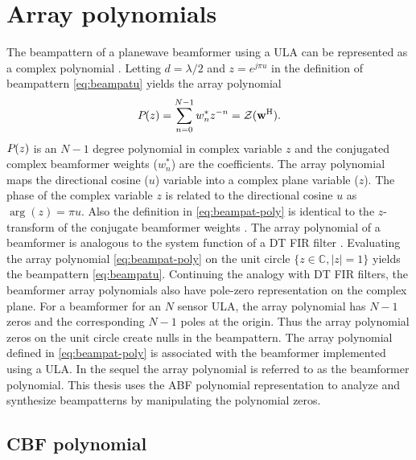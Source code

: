 
\section{Array polynomials}
\label{sec:array-poly}
The beampattern of a planewave beamformer using a ULA can be
represented as a complex polynomial
\cite{Schelkunoff1943array, Steinberg1976}. Letting $d = \lambda/2$ and
$z = e^{j\pi u}$ in the definition of beampattern \eqref{eq:beampatu} yields the array polynomial
\begin{equation}
  \label{eq:beampat-poly}
  {P}_{}(z) = \sum\limits_{n=0}^{N-1} w^*_n z^{-n} = \mathcal{Z}({\bf w}^{\rm H}).
\end{equation}
${P}_{}(z)$ is an $N-1$ degree polynomial in complex variable $z$
and the conjugated complex beamformer weights ($w^*_n$) are the
coefficients. The array polynomial maps the directional cosine ($u$)
variable into a complex plane variable ($z$). The phase of the complex
variable $z$ is related to the directional cosine $u$ as
$\operatorname{arg}(z) = \pi u$. Also the definition in
\eqref{eq:beampat-poly} is identical to the $z$-transform of the
conjugate beamformer weights \cite[Chap.~3]{Oppenheim1989}. The array
polynomial of a beamformer is analogous to the system function of a DT
FIR filter \cite{Oppenheim1989}. Evaluating the array polynomial
\eqref{eq:beampat-poly} on the unit circle
$\lbrace z \in \mathbb{C}, |z| = 1\rbrace$ yields the beampattern
\eqref{eq:beampatu}. Continuing the analogy with DT FIR filters, the
beamformer array polynomials also have pole-zero representation on the
complex plane. For a beamformer for an $N$ sensor ULA, the array
polynomial has $N - 1$ zeros and the corresponding $N - 1$ poles at
the origin. Thus the array polynomial zeros on the unit circle create
nulls in the beampattern. The array polynomial defined in
\eqref{eq:beampat-poly} is associated with the beamformer implemented
using a ULA. In the sequel the array polynomial is referred to as the
beamformer polynomial. This thesis uses the ABF polynomial
representation to analyze and synthesize beampatterns by manipulating
the polynomial zeros.

\subsection{CBF polynomial}
\label{sec:cbf-polynomial}

